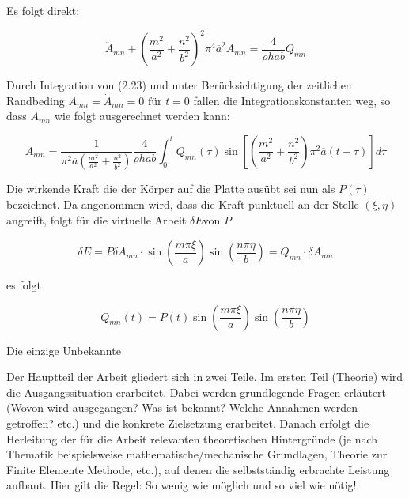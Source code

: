 Es folgt direkt:

\begin{equation}
\ddot{A}_{mn} + \left(\dfrac{m^2}{a^2} + \dfrac{n^2}{b^2}\right)^2 \pi^4 \overline{a}^2 A_{mn} = \dfrac{4}{\rho h a b} Q_{mn}
\end{equation}


Durch Integration von (2.23) und unter Berücksichtigung der zeitlichen Randbeding $A_{mn} = \dot{A}_{mn} = 0 \text{ für } t = 0$ fallen die Integrationskonstanten weg, so dass $A_{mn}$ wie folgt ausgerechnet werden kann:

\begin{equation}
A_{mn} = \dfrac{1}{\pi^2 \overline{a}  \left(\frac{m^2}{a^2} + \frac{n^2}{b^2} \right)} \dfrac{4}{\rho h a b} \int_0^t	Q_{mn}(\tau) \sin \left[ \left(\frac{m^2}{a^2} + \frac{n^2}{b^2} \right) \pi^2 \overline{a} (t-\tau)\right] d\tau
\end{equation}


Die wirkende Kraft die der Körper auf die Platte ausübt sei nun als $P(\tau)$ bezeichnet. 
Da angenommen wird, dass die Kraft punktuell an der Stelle $(\xi, \eta)$ angreift, folgt für die virtuelle Arbeit $\delta E$von $P$

\begin{equation}
\delta E = P \delta A_{mn} \cdot \sin \left( \dfrac{m \pi \xi}{a} \right) \sin \left( \dfrac{n \pi \eta}{b} \right) = Q_{mn} \cdot \delta A_{mn}
\end{equation} 

es folgt

\begin{equation}
Q_{mn}(t) = P(t) \sin \left( \dfrac{m \pi \xi}{a} \right) \sin \left( \dfrac{n \pi \eta}{b} \right)
\end{equation}




Die einzige Unbekannte 


Der Hauptteil der Arbeit gliedert sich in zwei Teile. Im ersten Teil (Theorie) wird die Ausgangssituation erarbeitet. Dabei werden grundlegende Fragen erläutert (Wovon wird ausgegangen? Was ist bekannt? Welche Annahmen werden getroffen? etc.) und die konkrete Zielsetzung erarbeitet. Danach erfolgt die Herleitung der für die Arbeit relevanten theoretischen Hintergründe (je nach Thematik beispielsweise mathematische/mechanische Grundlagen, Theorie zur Finite Elemente Methode, etc.), auf denen die selbstständig erbrachte Leistung aufbaut. Hier gilt die Regel: So wenig wie möglich und so viel wie nötig! 

